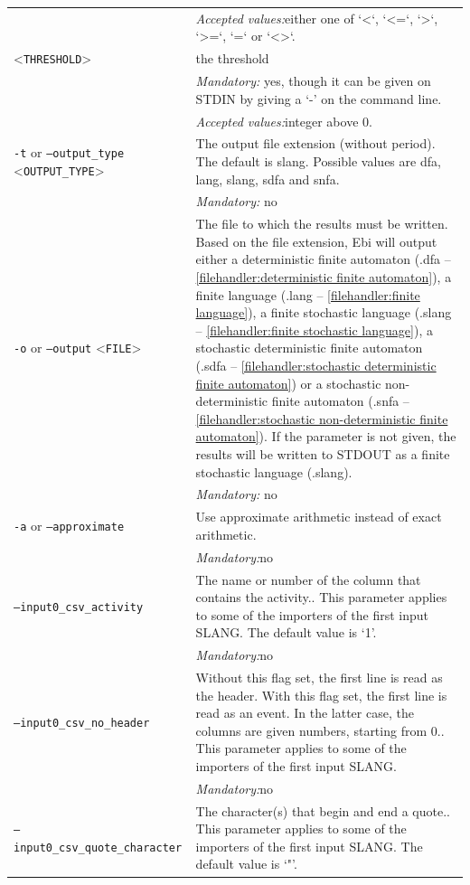 {\begin{tabularx}{\linewidth}{lX}
&\textit{Accepted values:}\quad either one of `<`, `<=`, `>`, `>=`, `=` or `<>`.\\
<\texttt{THRESHOLD}>&the threshold\\
&\textit{Mandatory:} \quad yes, though it can be given on STDIN by giving a `-' on the command line.\\
&\textit{Accepted values:}\quad integer above 0.\\
\texttt{-t} or \texttt{--output\_type} <\texttt{OUTPUT\_TYPE}> &
The output file extension (without period). The default is slang. Possible values are dfa, lang, slang, sdfa and snfa.\\
&\textit{Mandatory:} \quad no\\
\texttt{-o} or \texttt{--output} <\texttt{FILE}> &
The file to which the results must be written. Based on the file extension, Ebi will output either a deterministic finite automaton (.dfa -- \cref{filehandler:deterministic finite automaton}), a finite language (.lang -- \cref{filehandler:finite language}), a finite stochastic language (.slang -- \cref{filehandler:finite stochastic language}), a stochastic deterministic finite automaton (.sdfa -- \cref{filehandler:stochastic deterministic finite automaton}) or a stochastic non-deterministic finite automaton (.snfa -- \cref{filehandler:stochastic non-deterministic finite automaton}).
If the parameter is not given, the results will be written to STDOUT as a finite stochastic language (.slang).\\
&\textit{Mandatory:} \quad no\\
\texttt{-a} or \texttt{--approximate} & Use approximate arithmetic instead of exact arithmetic.\\
&\textit{Mandatory:}\quad no\\
\texttt{--input0\_csv\_activity} & The name or number of the column that contains the activity.. This parameter applies to some of the importers of the first input SLANG. The default value is `1'.\\
&\textit{Mandatory:}\quad no\\
\texttt{--input0\_csv\_no\_header} & Without this flag set, the first line is read as the header. 
    With this flag set, the first line is read as an event. In the latter case, the columns are given numbers, starting from 0.. This parameter applies to some of the importers of the first input SLANG. \\
&\textit{Mandatory:}\quad no\\
\texttt{--input0\_csv\_quote\_character} & The character(s) that begin and end a quote.. This parameter applies to some of the importers of the first input SLANG. The default value is `"'.\\

\end{tabularx}}
